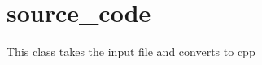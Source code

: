 \hypertarget{group__class}{}\section{source\+\_\+code}
\label{group__class}
This class takes the input file and converts to cpp 